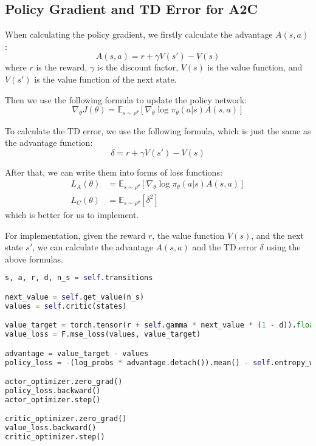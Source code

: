 \subsection{Policy Gradient and TD Error for A2C}
When calculating the policy gradient, we firstly calculate the advantage $A(s, a)$:
\begin{equation}
    A(s, a) = r + \gamma V(s') - V(s)
\end{equation}
where $r$ is the reward, $\gamma$ is the discount factor, $V(s)$ is the value function, and $V(s')$ is the value function of the next state.

Then we use the following formula to update the policy network:
\begin{equation}
    \nabla_\theta J(\theta) = \mathbb{E}_{s \sim \rho^\theta}[ \nabla_\theta \log \pi_\theta(a|s) A(s, a)]
\end{equation}

To calculate the TD error, we use the following formula, which is just the same as the advantage function:
\begin{equation}
    \delta = r + \gamma V(s') - V(s)
\end{equation}

After that, we can write them into forms of loss functions:
\begin{align}
    L_A(\theta) &= \mathbb{E}_{s \sim \rho^\theta}[ \nabla_\theta \log \pi_\theta(a|s) A(s, a)] \\
    L_C(\theta) &= \mathbb{E}_{s \sim \rho^\theta}[ \delta^2]
\end{align}
which is better for us to implement.

For implementation, given the reward $r$, the value function $V(s)$, and the next state $s'$, we can calculate the advantage $A(s, a)$ and the TD error $\delta$ using the above formulas.

\begin{lstlisting}[language=Python]
s, a, r, d, n_s = self.transitions

next_value = self.get_value(n_s)
values = self.critic(states)

value_target = torch.tensor(r + self.gamma * next_value * (1 - d)).float().to(self.device).reshape(-1, 1)
value_loss = F.mse_loss(values, value_target)

advantage = value_target - values
policy_loss = -(log_probs * advantage.detach()).mean() - self.entropy_weight * dist.entropy().mean()

actor_optimizer.zero_grad()
policy_loss.backward()
actor_optimizer.step()

critic_optimizer.zero_grad()
value_loss.backward()
critic_optimizer.step()
\end{lstlisting}

